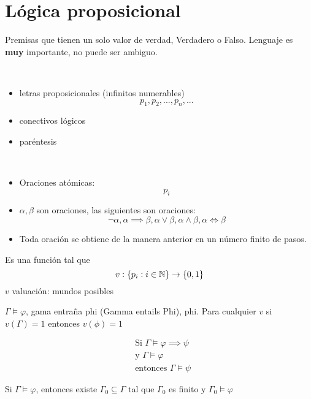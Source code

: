 \section{Lógica proposicional}
Premisas que tienen un solo valor de verdad, Verdadero o Falso. Lenguaje es \textbf{muy} importante, no puede ser ambiguo.
\begin{defn}
	\
	\begin{itemize}
		\item letras proposicionales (infinitos numerables)
		      \[
			      p_1,p_2,...,p_n,...
		      \]
		\item conectivos lógicos
		\item paréntesis
	\end{itemize}
\end{defn}
\begin{defn}[Oración]
	\
	\begin{itemize}
		\item Oraciones atómicas:
		      \[
			      p_i
		      \]
		\item $\alpha, \beta$ son oraciones, las siguientes son oraciones:
		      \[
			      \neg\alpha, \alpha\implies\beta, \alpha\vee\beta,\alpha\wedge\beta, \alpha\iff\beta
		      \]
		\item Toda oración se obtiene de la manera anterior en un número finito de pasos.
	\end{itemize}
\end{defn}
\begin{defn}
	Es una función tal que
	\[
		v:\{p_i: i\in\mathbb{N}\}\rightarrow\{0,1\}
	\]
	$v$ valuación: mundos posibles
\end{defn}
\begin{defn}
	$\Gamma\models\varphi$, gama entraña phi (Gamma entails Phi), phi. Para cualquier $v$ si $v(\Gamma)=1$ entonces $v(\phi)=1$
\end{defn}
\begin{ejm}
	\begin{align*}
		 & \text{Si }\Gamma\models\varphi\implies\psi \\
		 & \text{y  }\Gamma\models\varphi             \\
		 & \text{entonces }\Gamma\models\psi
	\end{align*}
\end{ejm}
\begin{ejm}
	Si $\Gamma\models\varphi$, entonces existe $\Gamma_0\subseteq\Gamma$ tal que $\Gamma_0$ es finito y $\Gamma_0\models\varphi$
\end{ejm}
